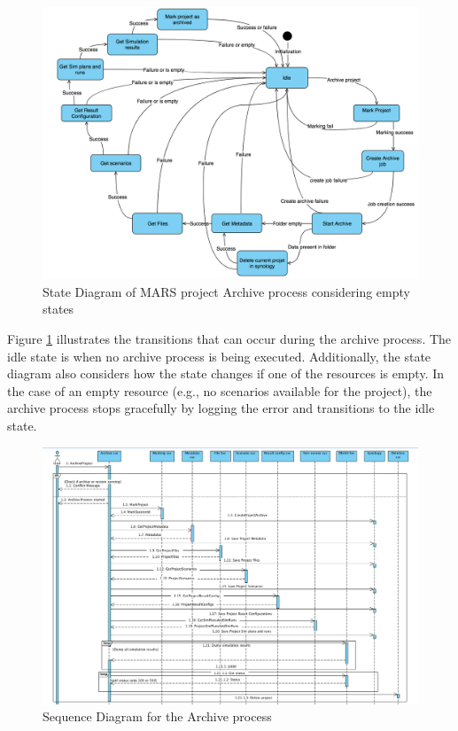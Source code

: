 \begin{figure}[H]
    \centering \includegraphics[scale=0.45]{grafiken/stateArchive.png}
    \caption{State Diagram of MARS project Archive process considering empty states}
    \label{fig:stateArchive}
\end{figure}

Figure \ref{fig:stateArchive} illustrates the transitions that can occur during the archive process. The idle state is when no archive process
is being executed. Additionally, the state diagram also considers
how the state changes if one of the resources is empty. In the case of an empty resource (e.g., no scenarios available for the project), the archive
process stops gracefully by logging the error and transitions to the idle state. 

\begin{figure}[H]
    \centering \includegraphics[scale=0.5, angle=90, origin=c]{grafiken/sequenceArchive.png}
    \caption{Sequence Diagram for the Archive process}
    \label{fig:sequenceArchive}
\end{figure}

